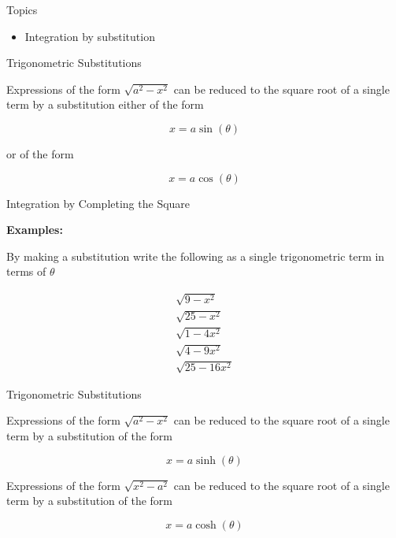 \documentclass[10pt]{beamer}
\begin{document}
\begin{frame}{Topics}
  \begin{itemize}
	  \item Integration by substitution
  \end{itemize}
\end{frame}

\begin{frame}{Trigonometric Substitutions}

	Expressions of the form $\sqrt{a^2-x^2}$ can be reduced to the square root of a single term by a substitution either of the form
	
	\begin{equation*}
		x = a\sin(\theta)
	\end{equation*}
	
	or of the form

	\begin{equation*}
		x = a\cos(\theta)
	\end{equation*}	
	
\end{frame}

\begin{frame}{Integration by Completing the Square}

	\textbf{Examples:}
	
	By making a substitution write the following as a single trigonometric term in terms of $\theta$
	
	\begin{align*}
		\sqrt{9-x^2} \\
		\sqrt{25-x^2} \\
		\sqrt{1-4x^2} \\
		\sqrt{4-9x^2} \\
		\sqrt{25-16x^2}
	\end{align*}
	
\end{frame}

\begin{frame}{Trigonometric Substitutions}

	Expressions of the form $\sqrt{a^2-x^2}$ can be reduced to the square root of a single term by a substitution of the form
	
	\begin{equation*}
		x = a\sinh(\theta)
	\end{equation*}
	
	Expressions of the form $\sqrt{x^2-a^2}$ can be reduced to the square root of a single term by a substitution of the form
		
	\begin{equation*}
		x = a\cosh(\theta)
	\end{equation*}
	
\end{frame}
\end{document}
